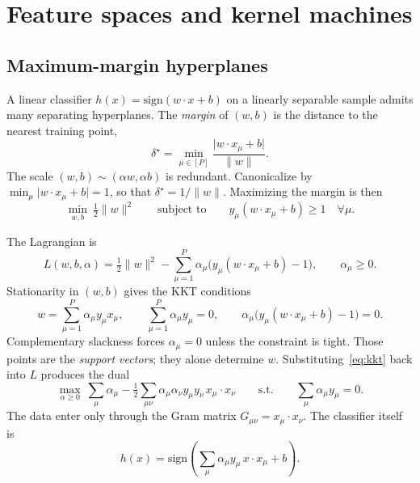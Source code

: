 \section{Feature spaces and kernel machines}
\label{sec:kernels}

\subsection{Maximum-margin hyperplanes}

A linear classifier $h(x)=\mathrm{sign}(w\cdot x+b)$ on a linearly separable sample admits many separating hyperplanes. The \emph{margin} of $(w,b)$ is the distance to the nearest training point,
\begin{equation}
  \delta^\star=\min_{\mu\in[P]}\frac{\lvert w\cdot x_\mu+b\rvert}{\|w\|}.
  \label{eq:margin}
\end{equation}
The scale $(w,b)\sim(\alpha w,\alpha b)$ is redundant. Canonicalize by $\min_\mu\lvert w\cdot x_\mu+b\rvert=1$, so that $\delta^\star=1/\|w\|$. Maximizing the margin is then
\begin{equation}
  \min_{w,b}\ \tfrac12\|w\|^2
  \qquad\text{subject to}\qquad
  y_\mu(w\cdot x_\mu+b)\ge 1
  \quad\forall\mu.
  \label{eq:hard-margin}
\end{equation}

The Lagrangian is
\begin{equation}
  L(w,b,\alpha)
  =\tfrac12\|w\|^2
  -\sum_{\mu=1}^{P}\alpha_\mu\bigl(y_\mu(w\cdot x_\mu+b)-1\bigr),
  \qquad \alpha_\mu\ge 0.
  \label{eq:lagrange}
\end{equation}
Stationarity in $(w,b)$ gives the KKT conditions
\begin{equation}
  w=\sum_{\mu=1}^{P}\alpha_\mu y_\mu x_\mu,
  \qquad
  \sum_{\mu=1}^{P}\alpha_\mu y_\mu=0,
  \qquad
  \alpha_\mu\bigl(y_\mu(w\cdot x_\mu+b)-1\bigr)=0.
  \label{eq:kkt}
\end{equation}
Complementary slackness forces $\alpha_\mu=0$ unless the constraint is tight. Those points are the \emph{support vectors}; they alone determine $w$. Substituting~\eqref{eq:kkt} back into $L$ produces the dual
\begin{equation}
  \max_{\alpha\ge 0}\
  \sum_{\mu}\alpha_\mu
  -\tfrac12\sum_{\mu\nu}\alpha_\mu\alpha_\nu y_\mu y_\nu\, x_\mu\cdot x_\nu
  \qquad\text{s.t.}\qquad
  \sum_{\mu}\alpha_\mu y_\mu=0.
  \label{eq:svm-dual}
\end{equation}
The data enter only through the Gram matrix $G_{\mu\nu}=x_\mu\cdot x_\nu$. The classifier itself is
\begin{equation}
  h(x)=\mathrm{sign}\!\left(\sum_{\mu}\alpha_\mu y_\mu\, x\cdot x_\mu+b\right).
  \label{eq:svm-pred}
\end{equation}

